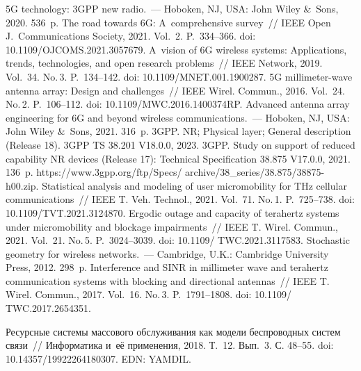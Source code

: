 \begin{multicols}{2}
{\small\frenchspacing
 { %
 \begin{thebibliography}{99}
 5G technology: 3GPP new radio.~--- Hoboken, NJ, 
USA: John Wiley \&~Sons, 2020. 536~p.
 The road towards 6G: A~comprehensive 
survey~// IEEE Open J.~Communications Society, 2021. Vol.~2. P.~334--366. doi: 
10.1109/OJCOMS.2021.3057679.
 A~vision of 6G wireless systems: Applications, trends, 
technologies, and open research problems~// IEEE Network, 2019. Vol.~34. No.\,3. P.~134--142. 
doi: 10.1109/MNET.001.1900287.
 5G millimeter-wave antenna array: Design 
and challenges~// IEEE Wirel. Commun., 2016. Vol.~24. No.\,2. P.~106--112. doi: 
10.1109/MWC.2016.1400374RP.
 Advanced antenna array engineering for 6G and beyond 
wireless communications.~--- Hoboken, NJ, USA: John Wiley \&~Sons, 2021. 316~p.
3GPP. NR; Physical layer; General description (Release 18). 3GPP TS 38.201 V18.0.0, 
2023.
3GPP. Study on support of reduced capability NR devices (Release 17): Technical Specification 
38.875 V17.0.0,  2021. 136~p. {\sf
https://www.3gpp.org/ftp/Specs/ archive/38\_series/38.875/38875-h00.zip}.
 Statistical analysis 
and modeling of user micromobility for THz cellular communications~// IEEE T. 
Veh. Technol., 2021. Vol.~71. No.\,1. P.~725--738. doi: 10.1109/TVT.2021.3124870.
 Ergodic outage and capacity of terahertz systems under micromobility and 
blockage impairments~// IEEE T. Wirel. Commun., 2021. Vol.~21. No.\,5. 
P.~3024--3039. doi: 10.1109/ TWC.2021.3117583.
 Stochastic geometry for wireless networks.~--- Cambridge, U.K.: Cambridge 
University Press, 2012. 298~p.
 Interference and 
SINR in millimeter wave and terahertz communication systems with blocking and directional 
antennas~// IEEE T. Wirel. Commun., 2017. Vol.~16. No.\,3.  
P.~1791--1808. doi: 10.1109/ TWC.2017.2654351.

 Ресурсные 
системы массового обслуживания как модели беспроводных систем связи~// Информатика и~её применения, 2018. Т.~12. Вып.~3. С. 48--55. doi: 10.14357/19922264180307.
EDN: YAMDIL.


\end{thebibliography}}}
\end{multicols}
